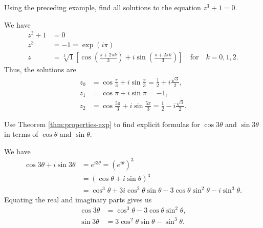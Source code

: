 \begin{example}
    Using the preceding example, find all solutions to the equation \(z^3 + 1 = 0\).

    \begin{solution}
        We have
        \[
            \begin{aligned}
                z^3 + 1 &= 0 \\
                z^3 &= -1 = \exp(i\pi) \\
                z &= \sqrt[3]{1}\left[\cos\left(\frac{\pi + 2\pi k}{3}\right) + i\sin\left(\frac{\pi + 2\pi k}{3}\right)\right] \quad \text{for} \quad k = 0, 1, 2.
            \end{aligned}
        \]
        Thus, the solutions are
        \[
            \begin{aligned}
                z_0 &= \cos\frac{\pi}{3} + i\sin\frac{\pi}{3} = \frac{1}{2} + i\frac{\sqrt{3}}{2}, \\
                z_1 &= \cos \pi + i\sin\pi = -1, \\
                z_2 &= \cos\frac{5\pi}{3} + i\sin\frac{5\pi}{3} = \frac{1}{2} - i\frac{\sqrt{3}}{2}.
            \end{aligned}
        \]
    \end{solution}
\end{example}

\begin{example}
    Use Theorem \ref{thm:properties-exp} to find explicit formulas for \(\cos 3\theta\) and \(\sin 3\theta\) in terms of \(\cos\theta\) and \(\sin\theta\).

    \begin{solution}
        We have
        \[
            \begin{aligned}
                \cos 3\theta + i\sin 3\theta &= e^{i3\theta} = (e^{i\theta})^3 \\
                &= (\cos\theta + i\sin\theta)^3 \\
                &= \cos^3\theta + 3i\cos^2\theta\sin\theta - 3\cos\theta\sin^2\theta - i\sin^3\theta.
            \end{aligned}
        \]
        Equating the real and imaginary parts gives us
        \[
            \begin{aligned}
                \cos 3\theta &= \cos^3\theta - 3\cos\theta\sin^2\theta, \\
                \sin 3\theta &= 3\cos^2\theta\sin\theta - \sin^3\theta.
            \end{aligned}
        \]
    \end{solution}
\end{example}


